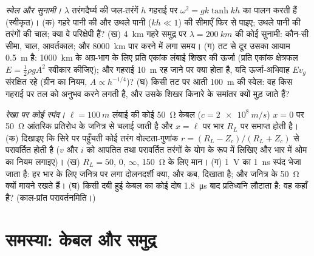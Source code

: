 \begin{exercise}[$\star\star\star$]\label{exo:b2:dispersion-wave-packets:11}
\emph{स्वेल और सुनामी।} $\lambda$ तरंगदैर्घ्य की जल-तरंगें $h$ गहराई पर
$\omega^2 = gk\tanh kh$ का पालन करती हैं (स्वीकृत)। (क) गहरे पानी की और
उथले पानी ($kh \ll 1$) की सीमाएँ फिर से पाइए; उथले पानी की तरंगों की चाल; क्या
वे परिक्षेपी हैं? (ख) \qty{4}{km} गहरे समुद्र पर $\lambda = \qty{200}{km}$ की कोई सुनामी:
कौन-सी सीमा, चाल, आवर्तकाल; और \qty{8000}{km} पार करने में लगा समय। (ग) तट से दूर
उसका आयाम \qty{0.5}{m} है: \qty{1000}{km} के अग्र-भाग के लिए प्रति एकांक लंबाई
शिखर की ऊर्जा (प्रति एकांक क्षेत्रफल $E = \tfrac12\rho gA^2$ स्वीकार कीजिए); और गहराई
\qty{10}{m} रह जाने पर क्या होता है, यदि ऊर्जा-अभिवाह $Ev_g$
संरक्षित रहे (ग्रीन का नियम, $A \propto h^{-1/4}$)? (घ) किसी तट पर आती
\qty{100}{m} की स्वेल: वह किस गहराई पर तल को अनुभव करने लगती है,
और उसके शिखर किनारे के समांतर क्यों मुड़ जाते हैं?
\end{exercise}

\begin{exercise}[$\star\star\star$]\label{exo:b2:dispersion-wave-packets:12}
\emph{रेखा पर कोई स्पंद।} $\ell = \qty{100}{m}$ लंबाई की कोई \qty{50}{\ohm} केबल
($c = \qty{2e8}{m/s}$) $x = 0$ पर \qty{50}{\ohm} आंतरिक प्रतिरोध के जनित्र से
चलाई जाती है और $x = \ell$ पर भार $R_L$ पर समाप्त होती है। (क) दिखाइए
कि सिरे पर पहुँचती कोई तरंग वोल्टता-गुणांक
$r = (R_L - Z_c)/(R_L + Z_c)$ से परावर्तित होती है ($v$ और $i$ को आपतित
तथा परावर्तित तरंगों के योग के रूप में लिखिए और भार में ओम का नियम लगाइए)। (ख)
$R_L = 50$, $0$, $\infty$, \qty{150}{\ohm} के लिए मान। (ग) \qty{1}{V} का \qty{1}{ns} स्पंद
भेजा जाता है: हर भार के लिए जनित्र पर लगा दोलनदर्शी क्या, और कब,
दिखाता है; और जनित्र के \qty{50}{\ohm} क्यों मायने रखते हैं। (घ) किसी दबी हुई
केबल का कोई दोष \qty{1.8}{\micro s} बाद प्रतिध्वनि लौटाता है: वह कहाँ है? (काल-प्रांत
परावर्तनमिति।)
\end{exercise}

\section{समस्या: केबल और समुद्र}

